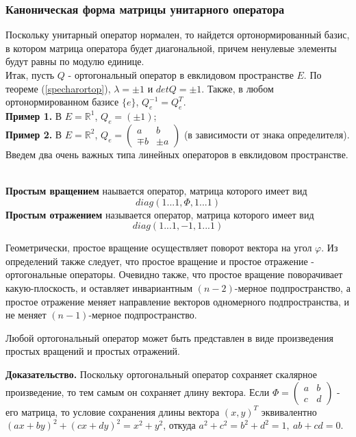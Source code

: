 \subsubsection{Каноническая форма матрицы унитарного оператора}
Поскольку унитарный оператор нормален, то найдется ортонормированный базис, в
котором матрица
оператора будет диагональной, причем ненулевые элементы будут равны по модулю
единице. \\
Итак, пусть $Q$ - ортогональный оператор в евклидовом пространстве $E$. По 
теореме (\ref{specharortop}), $\lambda=\pm1$ и $detQ=\pm1$. Также, в любом
ортонормированном базисе $\{e\}$, $Q_e^{-1}=Q_e^T$.\\
\textbf{Пример 1.} В $E=\mathbb R^1$, $Q_e=(\pm1)$;\\
\textbf{Пример 2.} В $E=\mathbb R^2$, $Q_e=\begin{pmatrix}a&b\\\mp b&\pm
a\end{pmatrix}$ (в зависимости от знака определителя).\\
Введем два очень важных типа линейных операторов в евклидовом пространстве.
\begin{defin}\makebox{}\\
\textbf{Простым вращением} наывается оператор, матрица которого имеет вид
$$diag(1...1,\Phi,1...1)$$
\textbf{Простым отражением} называется оператор, матрица которого имеет вид 
$$diag(1...1,-1,1...1)$$
\end{defin}
Геометрически, простое вращение осуществляет поворот вектора на угол $\varphi$.
Из определений также следует, что простое вращение и простое отражение -
ортогональные операторы. Очевидно также, что простое вращение
поворачивает какую-плоскость, и оставляет инвариантным $(n-2)$-мерное 
подпространство, а простое отражение меняет направление векторов одномерного 
подпространства, и не меняет $(n-1)$-мерное подпространство.
\begin{theor}
Любой ортогональный оператор может быть представлен в виде произведения 
простых вращений и простых отражений. 
\end{theor}
\textbf{Доказательство.} Поскольку ортогональный оператор сохраняет скалярное
		произведение, то тем самым он сохраняет длину вектора. Если
		$\Phi=\begin{pmatrix}a&b\\c&d\end{pmatrix}$ - его матрица, то условие
		сохранения длины вектора $(x,y)^T$ эквивалентно
		$(ax+by)^2+(cx+dy)^2=x^2+y^2$, откуда $a^2+c^2=b^2+d^2=1,~ab+cd=0$. 
